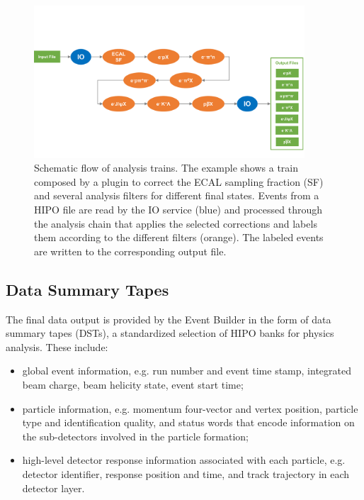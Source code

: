 \begin{figure}
    \includegraphics[width=0.9\textwidth]{pics/train.pdf}
    \caption{Schematic flow of analysis trains.  The example shows a train composed by a plugin to correct the ECAL sampling fraction (SF) and several analysis filters for different final states. Events from a HIPO file are read by the IO service (blue) and processed through the analysis chain that applies the selected corrections and labels them according to the different filters (orange). The labeled events are written to the corresponding output file.\label{fig:train}}
\end{figure}

\subsection{Data Summary Tapes}
\label{sec:dsts}

The final data output is provided by the Event Builder in the form of data summary tapes (DSTs), a standardized
selection of HIPO banks for physics analysis. These include:

\begin{itemize}
\item global event information, e.g. run number and event time stamp, integrated beam charge, beam helicity state,
  event start time;
\item particle information, e.g. momentum four-vector and vertex position, particle type and identification quality,
  and status words that encode information on the sub-detectors involved in the particle formation;
\item high-level detector response information associated with each particle, e.g. detector identifier, response
  position and time, and track trajectory in each detector layer.
\end{itemize}

